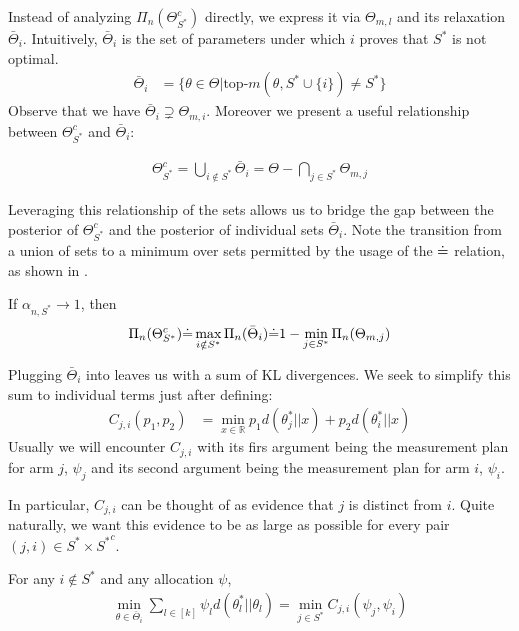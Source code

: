 Instead of analyzing $\Pi_n(\Theta_{S^*}^c)$ directly, we express it via
$\Theta_{m, l}$ and its relaxation $\bar{\Theta}_i$. Intuitively,
$\bar{\Theta}_i$ is the set of parameters under which $i$ proves that $S^*$ is
not optimal.
\begin{align}
  \bar{\Theta}_i &= \{ \theta \in \Theta | \text{top-}m(\theta, S^* \cup
      \{i\}) \neq S^*\}
\end{align}
Observe that we have $\bar{\Theta}_i \supsetneq \Theta_{m, i}$. Moreover we
present a useful relationship between $\Theta_{S^*}^c$ and $\bar{\Theta}_i$:
\begin{lemma}\label{lemma:set_relation_S*_i}
  \begin{align}
    \Theta_{S^*}^c = \bigcup_{i \notin S^*} \bar{\Theta}_i = \Theta -
        \bigcap_{j \in S^*} \Theta_{m, j}
  \end{align}
\end{lemma}
Leveraging this relationship of the sets allows us to bridge the gap between the
posterior of $\Theta_{S^*}^c$ and the posterior of individual sets
$\bar{\Theta}_i$. Note the transition from a union of sets to a minimum over
sets permitted by the usage of the $\dot{=}$ relation, as shown in
.
\begin{lemma}
  \label{lemma:posterior_S*_i} If $\alpha_{n, S^*} \rightarrow 1$, then
  \begin{align}
    \Pi_n(\Theta_{S^*}^c) \dot{=} \max_{i \notin S^*} \Pi_n(\bar{\Theta}_i) \dot{=} 1
        - \min_{j \in S^*} \Pi_n(\Theta_{m, j})
  \end{align}
\end{lemma}
Plugging $\bar{\Theta}_i$ into  leaves us with a sum of
KL divergences. We seek to simplify this sum to individual terms just after
defining:
\begin{align}
  C_{j, i}(p_1, p_2) &= \min_{x \in \mathbb{R}} p_1 d(\theta^*_{j} || x) + p_2
      d(\theta_{i}^* ||x) \label{eq:C}
\end{align}
Usually we will encounter $C_{j, i}$ with its firs argument being the
measurement plan for arm $j$, $\psi_j$ and its second argument being the
measurement plan for arm $i$, $\psi_i$.

In particular, $C_{j, i}$ can be thought of as evidence that $j$ is distinct
from $i$. Quite naturally, we want this evidence to be as large as possible for
every pair $(j, i) \in S^* \times {S^*}^c$.

\begin{lemma}\label{lemma:kl_to_C}
  For any $i \notin S^*$ and any allocation $\psi$,
  \begin{align}
    \min_{\theta \in \bar{\Theta}_i} \sum_{l \in [k]}\psi_l
        d(\theta^*_l||\theta_l) = \min_{j \in S^*} C_{j, i}(\psi_j, \psi_i)
  \end{align}
\end{lemma}

